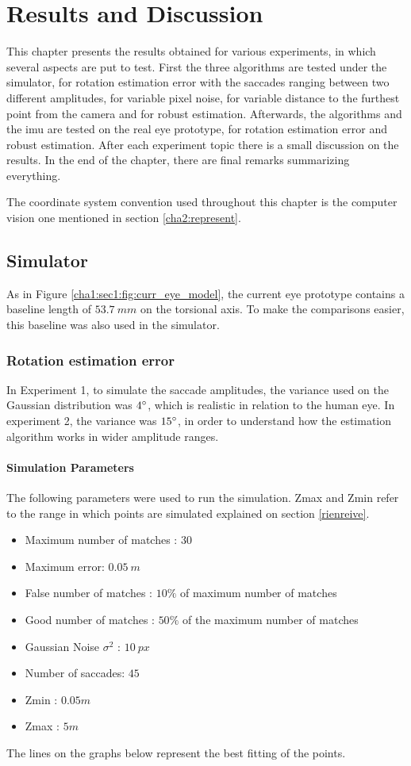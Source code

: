
\chapter{Results and Discussion}
\label{cha4:results}

This chapter presents the results obtained for various experiments, in which several aspects are put to test. First the three algorithms are tested under the simulator, for rotation estimation error with the saccades ranging between two different amplitudes, for variable pixel noise, for variable distance to the furthest point from the camera and for robust estimation. Afterwards, the algorithms and the \acrshort{imu} are tested on the real eye prototype, for rotation estimation error and robust estimation. After each experiment topic there is a small discussion on the results. In the end of the chapter, there are final remarks summarizing everything.

The coordinate system convention used throughout this chapter is the computer vision one mentioned in section \ref{cha2:represent}. 

\section{Simulator}
As in Figure \ref{cha1:sec1:fig:curr_eye_model}, the current eye prototype contains a baseline length of $53.7 \ mm$ on the torsional axis. To make the comparisons easier, this baseline was also used in the simulator.
\subsection{Rotation estimation error}
\label{reiovniorevn}
In Experiment 1, to simulate the saccade amplitudes, the variance used on the Gaussian distribution was $4 \degree$, which is realistic in relation to the human eye. In experiment 2, the variance was $15 \degree$, in order to understand how the estimation algorithm works in wider amplitude ranges.
\subsubsection{Simulation Parameters}
The following parameters were used to run the simulation. Zmax and Zmin refer to the range in which points are simulated explained on section \ref{rienreive}.
\begin{itemize}
	\item Maximum number of matches : $30$
	\item Maximum error: $0.05 \ m$
	\item False number of matches : $10 \%$ of maximum number of matches
	\item Good number of matches : $50 \%$ of the maximum number of matches
	\item Gaussian Noise $\sigma^2$ : $10 \ px$
	\item Number of saccades: $45$
	\item Zmin : $0.05 m$
	\item Zmax : $5 m$
\end{itemize}
The lines on the graphs below represent the best fitting of the points.
